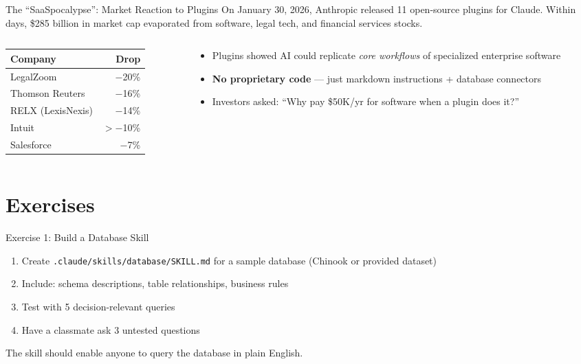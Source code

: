 \documentclass[aspectratio=169]{beamer}
\begin{document}
\begin{frame}[shrink=10]{The ``SaaSpocalypse'': Market Reaction to Plugins}
On January 30, 2026, Anthropic released 11 open-source plugins for Claude.  Within days, \alert{\$285 billion} in market cap evaporated from software, legal tech, and financial services stocks.
\vspace{0.2cm}
\begin{columns}[T]
\begin{column}{0.5\textwidth}
\begin{shadedbox}[title=\textbf{Hardest-Hit Stocks}]
\scriptsize
\begin{tabular}{@{} l r @{}}
\toprule
\textbf{Company} & \textbf{Drop} \\
\midrule
LegalZoom & $-$20\% \\
Thomson Reuters & $-$16\% \\
RELX (LexisNexis) & $-$14\% \\
Intuit & $>-$10\% \\
Salesforce & $-$7\% \\
\bottomrule
\end{tabular}
\end{shadedbox}
\end{column}
\begin{column}{0.5\textwidth}
\begin{shadedbox}[title=\textbf{Why It Happened}]
\begin{itemize}\scriptsize
  \item Plugins showed AI could replicate \textit{core workflows} of specialized enterprise software
  \item \textbf{No proprietary code} --- just markdown instructions + database connectors
  \item Investors asked: ``Why pay \$50K/yr for software when a plugin does it?''
\end{itemize}
\end{shadedbox}
\end{column}
\end{columns}
\end{frame}

\section{Exercises}

\begin{frame}{Exercise 1: Build a Database Skill}
\begin{enumerate}
  \item Create \texttt{.claude/skills/database/SKILL.md} for a sample database (Chinook or provided dataset)
  \item Include: schema descriptions, table relationships, business rules
  \item Test with 5 decision-relevant queries
  \item Have a classmate ask 3 untested questions
\end{enumerate}
\vspace{0.3cm}
\alert{The skill should enable anyone to query the database in plain English.}
\end{frame}
\end{document}
